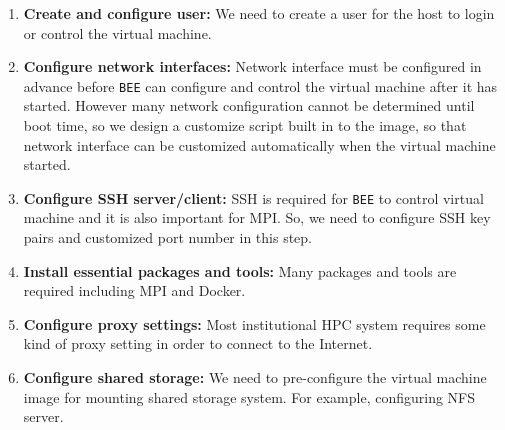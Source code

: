 \begin{enumerate}
\item \textbf{Create and configure user:} We need to create a user for the host to login or control the virtual machine.
\item \textbf{Configure network interfaces:} Network interface must be configured in advance before \texttt{BEE} can configure and control the virtual machine after it has started. However many network configuration cannot be determined until boot time, so we design a customize script built in to the image, so that network interface can be customized automatically when the virtual machine started.
\item \textbf{Configure SSH server/client:} SSH is required for \texttt{BEE} to control virtual machine and it is also important for MPI. So, we need to configure SSH key pairs and customized port number in this step.
\item \textbf{Install essential packages and tools:} Many packages and tools are required including MPI and Docker.
\item \textbf{Configure proxy settings:} Most institutional HPC system requires some kind of proxy setting in order to connect to the Internet. 
\item \textbf{Configure shared storage:} We need to pre-configure the virtual machine image for mounting shared storage system. For example, configuring NFS server.
\end{enumerate} 


